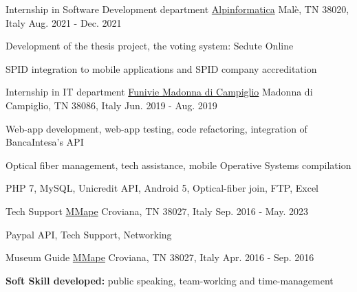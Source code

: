 \begin{cventries}
  \cventry
    {Internship in Software Development department} %
    {\href{https://www.alpinformatica.com/}{Alpinformatica}} %
    {Malè, TN 38020, Italy} %
    {Aug. 2021 - Dec. 2021} %
    {
      \begin{cvitems} %
        \item {Development of the thesis project, the voting system: Sedute Online}
        \item {SPID integration to mobile applications and SPID company accreditation}
      \end{cvitems}
    }
\cventry
{Internship in IT department} %
{\href{https://www.funiviecampiglio.it}{Funivie Madonna di Campiglio}} %
{Madonna di Campiglio, TN 38086, Italy} %
{Jun. 2019 - Aug. 2019} %
{
  \begin{cvitems} %
    \item {Web-app development, web-app testing, code refactoring, integration of BancaIntesa's API}
    \item {Optical fiber management, tech assistance, mobile Operative Systems compilation}
    \item {PHP 7, MySQL, Unicredit API, Android 5, Optical-fiber join, FTP, Excel}
  \end{cvitems}
  }

\cventry
{Tech Support} %
{\href{https://www.mmape.it}{MMape}} %
{Croviana, TN 38027, Italy} %
{Sep. 2016 - May. 2023} %
{
  \begin{cvitems} %
    \item {Paypal API, Tech Support, Networking}
  \end{cvitems}
}

\cventry
{Museum Guide} %
{\href{https://www.mmape.it}{MMape}} %
{Croviana, TN 38027, Italy} %
{Apr. 2016 - Sep. 2016} %
{
  \begin{cvitems} %
    \item {\textbf{Soft Skill developed:} public speaking, team-working and time-management}
  \end{cvitems}
}


\end{cventries}
